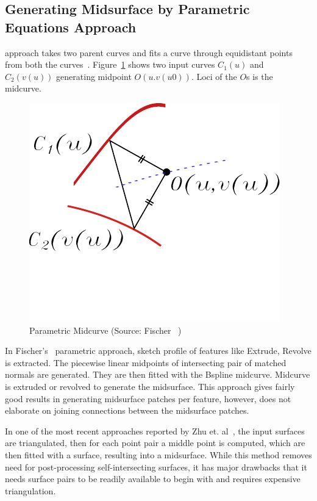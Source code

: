 \subsection{Generating Midsurface by Parametric Equations Approach}	
 approach takes two parent curves and fits a curve through equidistant points from both the curves~\cite{Elber1999, Fischer1997}. Figure~\ref{fig:litsurvey:parametric} shows two input curves $C_1(u)$ and $C_2(v(u))$ generating midpoint $O(u.v(u0))$. Loci of the $O$s is the midcurve. 


	\begin{figure} [!h]
		\centering
		\includegraphics[width=0.4\linewidth]{images/MidcurvesDefn}
		\caption{Parametric Midcurve (Source: Fischer~\cite{Fischer1997} )}
		\label{fig:litsurvey:parametric}
	\end{figure}
	

In Fischer's~\cite{Fischer1997} parametric approach, sketch profile of features like Extrude, Revolve is extracted. The piecewise linear midpoints  of intersecting pair of matched normals are generated. They are then fitted with the Bspline midcurve. Midcurve is extruded or revolved to generate the midsurface.  This approach gives fairly good results in generating midsurface patches per feature, however, does not elaborate on joining connections between the midsurface patches.

In one of the most recent approaches reported by Zhu et. al~\cite{Zhu2015, Zhu2016}, the input surfaces are triangulated, then for each point pair a middle point is computed, which are then fitted with a surface, resulting into a midsurface. While this method removes need for post-processing self-intersecting surfaces, it has major drawbacks that it needs surface pairs to be readily available to begin with and requires expensive triangulation.

